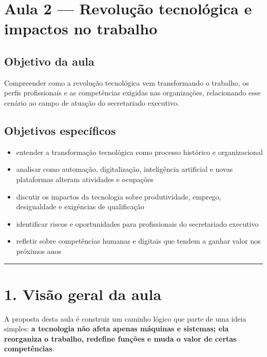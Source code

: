 \documentclass[
]{book}
\providecommand{\tightlist}{%
  \setlength{\itemsep}{0pt}\setlength{\parskip}{0pt}}
\theoremstyle{definition}
\theoremstyle{definition}
\theoremstyle{definition}
\theoremstyle{definition}
\theoremstyle{remark}
\begin{document}
\chapter{Aula 2 --- Revolução tecnológica e impactos no trabalho}\label{aula-2-revoluuxe7uxe3o-tecnoluxf3gica-e-impactos-no-trabalho}

\section{Objetivo da aula}\label{objetivo-da-aula}

Compreender como a revolução tecnológica vem transformando o trabalho, os perfis profissionais e as competências exigidas nas organizações, relacionando esse cenário ao campo de atuação do secretariado executivo.

\section{Objetivos específicos}\label{objetivos-especuxedficos}

\begin{itemize}
\tightlist
\item
  entender a transformação tecnológica como processo histórico e organizacional
\item
  analisar como automação, digitalização, inteligência artificial e novas plataformas alteram atividades e ocupações
\item
  discutir os impactos da tecnologia sobre produtividade, emprego, desigualdade e exigências de qualificação
\item
  identificar riscos e oportunidades para profissionais do secretariado executivo
\item
  refletir sobre competências humanas e digitais que tendem a ganhar valor nos próximos anos
\end{itemize}

\begin{center}\rule{0.5\linewidth}{0.5pt}\end{center}

\chapter{1. Visão geral da aula}\label{visuxe3o-geral-da-aula}

A proposta desta aula é construir um caminho lógico que parte de uma ideia simples: \textbf{a tecnologia não afeta apenas máquinas e sistemas; ela reorganiza o trabalho, redefine funções e muda o valor de certas competências}.
\end{document}
